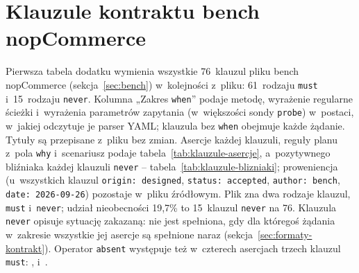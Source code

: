 \section{Klauzule kontraktu bench nopCommerce}\label{app:klauzule}

Pierwsza tabela dodatku wymienia wszystkie 76~klauzul pliku 
bench nopCommerce (sekcja~\ref{sec:bench}) w~kolejności z~pliku: 61~rodzaju \texttt{must}
i~15~rodzaju \texttt{never}. Kolumna „Zakres \texttt{when}” podaje metodę, wyrażenie
regularne ścieżki i~wyrażenia parametrów zapytania (w~większości sondy \texttt{probe})
w~postaci, w~jakiej odczytuje je parser YAML; klauzula bez \texttt{when} obejmuje każde
żądanie. Tytuły są przepisane z~pliku bez zmian. Asercje każdej klauzuli, reguły planu
z~pola \texttt{why} i~scenariusz podaje tabela~\ref{tab:klauzule-asercje}, a~pozytywnego
bliźniaka każdej klauzuli \texttt{never} -- tabela~\ref{tab:klauzule-blizniaki};
proweniencja (u~wszystkich klauzul \texttt{origin: designed}, \texttt{status: accepted},
\texttt{author: bench}, \texttt{date: 2026-09-26}) pozostaje w~pliku źródłowym. Plik zna
dwa rodzaje klauzul, \texttt{must} i~\texttt{never}; udział nieobecności 19,7\% to
15~klauzul \texttt{never} na 76. Klauzula \texttt{never} opisuje sytuację zakazaną: nie
jest spełniona, gdy dla któregoś żądania w~zakresie wszystkie jej asercje są spełnione
naraz (sekcja~\ref{sec:formaty-kontrakt}). Operator \texttt{absent} występuje też
w~czterech asercjach trzech klauzul \texttt{must}: ,
 i~.

